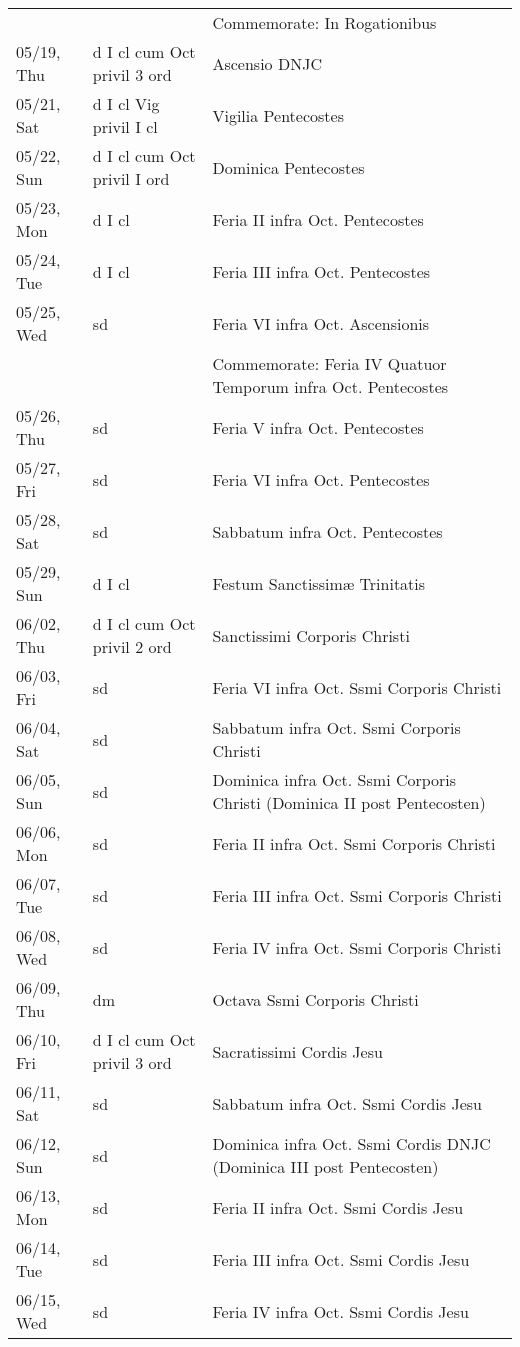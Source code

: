 \documentclass{article}
\begin{document}
\begin{longtable}{ l l l }
 & & Commemorate: In Rogationibus\\
05/19, Thu & d I cl cum Oct privil 3 ord & Ascensio DNJC\\
05/21, Sat & d I cl Vig privil I cl & Vigilia Pentecostes\\
05/22, Sun & d I cl cum Oct privil I ord & Dominica Pentecostes\\
05/23, Mon & d I cl & Feria II infra Oct. Pentecostes\\
05/24, Tue & d I cl & Feria III infra Oct. Pentecostes\\
05/25, Wed & sd & Feria VI infra Oct. Ascensionis\\
 & & Commemorate: Feria IV Quatuor Temporum infra Oct. Pentecostes\\
05/26, Thu & sd & Feria V infra Oct. Pentecostes\\
05/27, Fri & sd & Feria VI infra Oct. Pentecostes\\
05/28, Sat & sd & Sabbatum infra Oct. Pentecostes\\
05/29, Sun & d I cl & Festum Sanctissimæ Trinitatis\\
06/02, Thu & d I cl cum Oct privil 2 ord & Sanctissimi Corporis Christi\\
06/03, Fri & sd & Feria VI infra Oct. Ssmi Corporis Christi\\
06/04, Sat & sd & Sabbatum infra Oct. Ssmi Corporis Christi\\
06/05, Sun & sd & Dominica infra Oct. Ssmi Corporis Christi (Dominica II post Pentecosten)\\
06/06, Mon & sd & Feria II infra Oct. Ssmi Corporis Christi\\
06/07, Tue & sd & Feria III infra Oct. Ssmi Corporis Christi\\
06/08, Wed & sd & Feria IV infra Oct. Ssmi Corporis Christi\\
06/09, Thu & dm & Octava Ssmi Corporis Christi\\
06/10, Fri & d I cl cum Oct privil 3 ord & Sacratissimi Cordis Jesu\\
06/11, Sat & sd & Sabbatum infra Oct. Ssmi Cordis Jesu\\
06/12, Sun & sd & Dominica infra Oct. Ssmi Cordis DNJC (Dominica III post Pentecosten)\\
06/13, Mon & sd & Feria II infra Oct. Ssmi Cordis Jesu\\
06/14, Tue & sd & Feria III infra Oct. Ssmi Cordis Jesu\\
06/15, Wed & sd & Feria IV infra Oct. Ssmi Cordis Jesu\\

\end{longtable}
\end{document}
